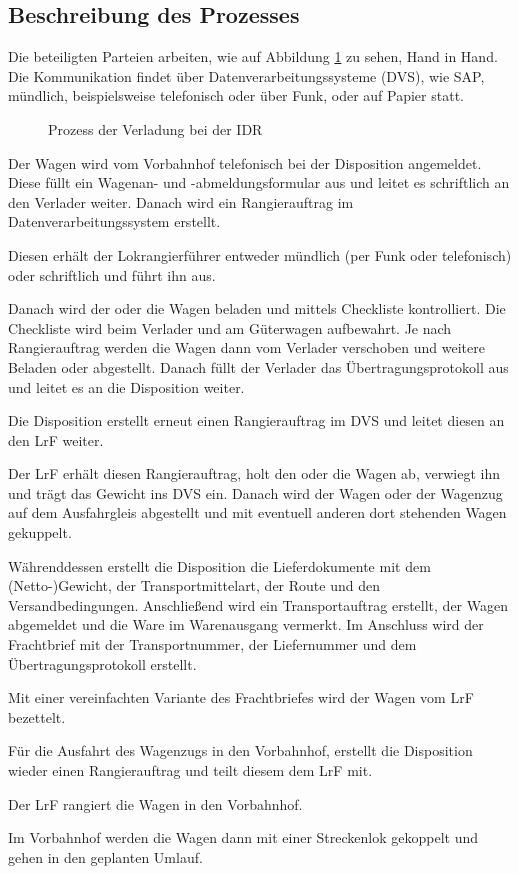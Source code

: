 \subsection{Beschreibung des Prozesses}
Die beteiligten Parteien arbeiten, wie auf Abbildung \ref{fig:IDR_Warenausgang} zu sehen, Hand in Hand. Die Kommunikation findet über Datenverarbeitungssysteme (DVS), wie SAP, mündlich, beispielsweise telefonisch oder über Funk, oder auf Papier statt.\par
\begin{figure}
    \centering
    
    \caption{Prozess der Verladung bei der IDR}
    \label{fig:IDR_Warenausgang}
\end{figure}
Der Wagen wird vom Vorbahnhof telefonisch bei der Disposition angemeldet. Diese füllt ein Wagenan- und -abmeldungsformular aus und leitet es schriftlich an den Verlader weiter. Danach wird ein Rangierauftrag im Datenverarbeitungssystem erstellt.\par
Diesen erhält der Lokrangierführer entweder mündlich (per Funk oder telefonisch) oder schriftlich und führt ihn aus.\par
Danach wird der oder die Wagen beladen und mittels Checkliste kontrolliert. Die Checkliste wird beim Verlader und am Güterwagen aufbewahrt. Je nach Rangierauftrag werden die Wagen dann vom Verlader verschoben und weitere Beladen oder abgestellt. Danach füllt der Verlader das Übertragungsprotokoll aus und leitet es an die Disposition weiter.\par
Die Disposition erstellt erneut einen Rangierauftrag im DVS und leitet diesen an den LrF weiter.\par
Der LrF erhält diesen Rangierauftrag, holt den oder die Wagen ab, verwiegt ihn und trägt das Gewicht ins DVS ein. Danach wird der Wagen oder der Wagenzug auf dem Ausfahrgleis abgestellt und mit eventuell anderen dort stehenden Wagen gekuppelt.\par
Währenddessen erstellt die Disposition die Lieferdokumente mit dem (Netto-)Gewicht, der Transportmittelart, der Route und den Versandbedingungen. Anschließend wird ein Transportauftrag erstellt, der Wagen abgemeldet und die Ware im Warenausgang vermerkt. Im Anschluss wird der Frachtbrief mit der Transportnummer, der Liefernummer und dem Übertragungsprotokoll erstellt.\par
Mit einer vereinfachten Variante des Frachtbriefes wird der Wagen vom LrF bezettelt.\par
Für die Ausfahrt des Wagenzugs in den Vorbahnhof, erstellt die Disposition wieder einen Rangierauftrag und teilt diesem dem LrF mit.\par
Der LrF rangiert die Wagen in den Vorbahnhof.\par
Im Vorbahnhof werden die Wagen dann mit einer Streckenlok gekoppelt und gehen in den geplanten Umlauf.

